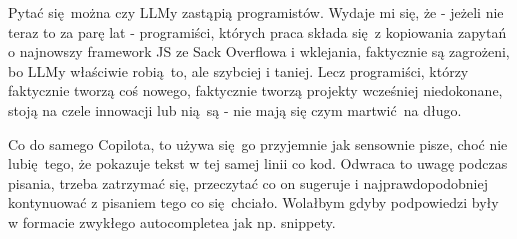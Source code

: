 Pytać się można czy LLMy zastąpią programistów. Wydaje mi się, że - jeżeli nie teraz to za parę lat - programiści, których praca składa się z kopiowania zapytań o najnowszy framework JS ze Sack Overflowa i wklejania, faktycznie są zagrożeni, bo LLMy właściwie robią to, ale szybciej i taniej. Lecz programiści, którzy faktycznie tworzą coś nowego, faktycznie tworzą projekty wcześniej niedokonane, stoją na czele innowacji lub nią są - nie mają się czym martwić na długo.

Co do samego Copilota, to używa się go przyjemnie jak sensownie pisze, choć nie lubię tego, że pokazuje tekst w tej samej linii co kod. Odwraca to uwagę podczas pisania, trzeba zatrzymać się, przeczytać co on sugeruje i najprawdopodobniej kontynuować z pisaniem tego co się chciało. Wolałbym gdyby podpowiedzi były w formacie zwykłego autocompletea jak np. snippety. 
